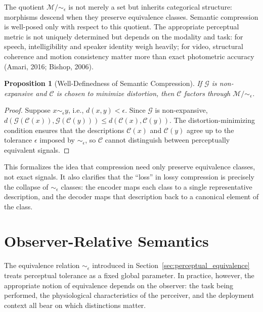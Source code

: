 \documentclass[11pt,a4paper]{article}
\newtheorem{proposition}[theorem]{Proposition}
\theoremstyle{definition}
\theoremstyle{remark}
\begin{document}
The quotient $\mathcal{M}/\!\sim_\epsilon$ is not merely a set but inherits categorical structure: morphisms descend when they preserve equivalence classes. Semantic compression is well-posed only with respect to this quotient. The appropriate perceptual metric is not uniquely determined but depends on the modality and task: for speech, intelligibility and speaker identity weigh heavily; for video, structural coherence and motion consistency matter more than exact photometric accuracy (Amari, 2016; Bishop, 2006).

\begin{proposition}[Well-Definedness of Semantic Compression]
If $\mathcal{G}$ is non-expansive and $\mathcal{C}$ is chosen to minimize distortion, then $\mathcal{C}$ factors through $\mathcal{M}/\!\sim_\epsilon$.
\end{proposition}

\begin{proof}
Suppose $x \sim_\epsilon y$, i.e., $d(x,y) < \epsilon$. Since $\mathcal{G}$ is non-expansive, $d(\mathcal{G}(\mathcal{C}(x)), \mathcal{G}(\mathcal{C}(y))) \le d(\mathcal{C}(x), \mathcal{C}(y))$. The distortion-minimizing condition ensures that the descriptions $\mathcal{C}(x)$ and $\mathcal{C}(y)$ agree up to the tolerance $\epsilon$ imposed by $\sim_\epsilon$, so $\mathcal{C}$ cannot distinguish between perceptually equivalent signals.
\end{proof}

This formalizes the idea that compression need only preserve equivalence classes, not exact signals. It also clarifies that the ``loss'' in lossy compression is precisely the collapse of $\sim_\epsilon$ classes: the encoder maps each class to a single representative description, and the decoder maps that description back to a canonical element of the class.

\section{Observer-Relative Semantics}
\label{sec:observer}

The equivalence relation $\sim_\epsilon$ introduced in Section~\ref{sec:perceptual_equivalence} treats perceptual tolerance as a fixed global parameter. In practice, however, the appropriate notion of equivalence depends on the observer: the task being performed, the physiological characteristics of the perceiver, and the deployment context all bear on which distinctions matter.
\end{document}
